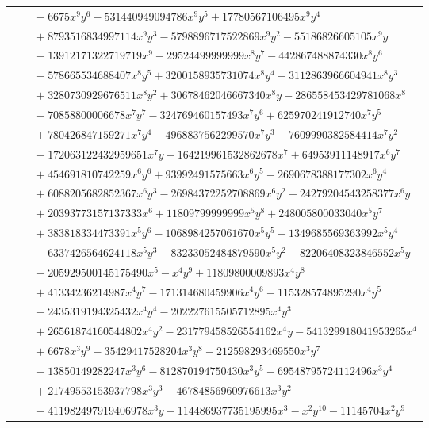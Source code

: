 \documentclass[11pt]{article}
\begin{document}
\begin{longtable}{@{}ll@{}}
 & $\quad -6675x^{9}y^{6}-531440949094786x^{9}y^{5}+17780567106495x^{9}y^{4}$\\
 & $\quad +8793516834997114x^{9}y^{3}-5798896717522869x^{9}y^{2}-55186826605105x^{9}y$\\
 & $\quad -13912171322719719x^{9}-29524499999999x^{8}y^{7}-442867488874330x^{8}y^{6}$\\
 & $\quad -578665534688407x^{8}y^{5}+3200158935731074x^{8}y^{4}+3112863966604941x^{8}y^{3}$\\
 & $\quad +3280730929676511x^{8}y^{2}+30678462046667340x^{8}y-286558453429781068x^{8}$\\
 & $\quad -70858800006678x^{7}y^{7}-324769460157493x^{7}y^{6}+625970241912740x^{7}y^{5}$\\
 & $\quad +780426847159271x^{7}y^{4}-4968837562299570x^{7}y^{3}+7609990382584414x^{7}y^{2}$\\
 & $\quad -172063122432959651x^{7}y-164219961532862678x^{7}+64953911148917x^{6}y^{7}$\\
 & $\quad +454691810742259x^{6}y^{6}+93992491575663x^{6}y^{5}-2690678388177302x^{6}y^{4}$\\
 & $\quad +6088205682852367x^{6}y^{3}-26984372252708869x^{6}y^{2}-24279204543258377x^{6}y$\\
 & $\quad +20393773157137333x^{6}+11809799999999x^{5}y^{8}+248005800033040x^{5}y^{7}$\\
 & $\quad +383818334473391x^{5}y^{6}-1068984257061670x^{5}y^{5}-1349685569363992x^{5}y^{4}$\\
 & $\quad -6337426564624118x^{5}y^{3}-83233052484879590x^{5}y^{2}+82206408323846552x^{5}y$\\
 & $\quad -205929500145175490x^{5}-x^{4}y^{9}+11809800009893x^{4}y^{8}$\\
 & $\quad +41334236214987x^{4}y^{7}-171314680459906x^{4}y^{6}-115328574895290x^{4}y^{5}$\\
 & $\quad -2435319194325432x^{4}y^{4}-202227615505712895x^{4}y^{3}$\\
 & $\quad +26561874160544802x^{4}y^{2}-231779458526554162x^{4}y-541329918041953265x^{4}$\\
 & $\quad +6678x^{3}y^{9}-35429417528204x^{3}y^{8}-212598293469550x^{3}y^{7}$\\
 & $\quad -13850149282247x^{3}y^{6}-812870194750430x^{3}y^{5}-69548795724112496x^{3}y^{4}$\\
 & $\quad +21749553153937798x^{3}y^{3}-46784856960976613x^{3}y^{2}$\\
 & $\quad -411982497919406978x^{3}y-114486937735195995x^{3}-x^{2}y^{10}-11145704x^{2}y^{9}$\\

\end{longtable}
\end{document}
